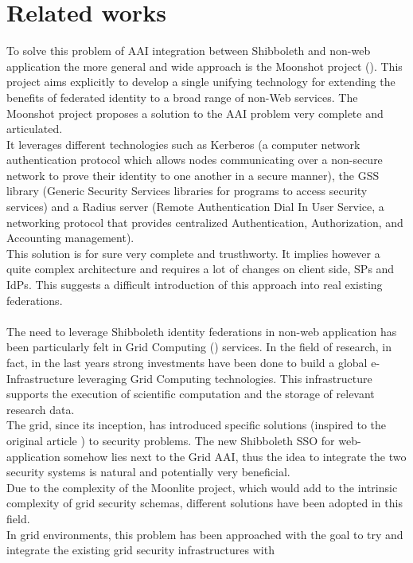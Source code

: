 \section{Related works}
To solve this problem of AAI integration between Shibboleth and non-web application the more general and wide approach is the Moonshot project (\cite{Howlett-2010}).
This project aims explicitly to develop a single unifying technology for extending the benefits of federated identity to a broad range of
non-Web services.
The Moonshot project proposes a solution to the AAI problem very complete and articulated.\\
It leverages different technologies such as Kerberos (a computer network authentication protocol which allows nodes communicating over a
non-secure network to prove their identity to one another in a secure manner), the GSS library (Generic Security Services libraries for
programs to access security services) and a Radius server (Remote Authentication Dial In User Service, a networking protocol that provides
centralized Authentication, Authorization, and Accounting management).\\
This solution is for sure very complete and trusthworty.
It implies however a quite complex architecture and requires a lot of changes on client side, SPs and IdPs.
This suggests a difficult introduction of this approach into real existing federations.\\
\\
The need to leverage Shibboleth identity federations in non-web application has been particularly felt in Grid Computing
(\cite{Kesselman-1998}) services.
In the field of research, in fact, in the last years strong investments have been done to build a global e-Infrastructure leveraging Grid
Computing technologies.
This infrastructure supports the execution of scientific computation and the storage of relevant research data.\\
The grid, since its inception, has introduced specific solutions (inspired to the original article \cite{Foster-1998}) to security problems.
The new Shibboleth SSO for web-application somehow lies next to the Grid AAI, thus the idea to integrate the two security systems is natural
and potentially very beneficial.\\
Due to the complexity of the Moonlite project, which would add to the intrinsic complexity of grid security schemas, different solutions have
been adopted in this field.
\\
In grid environments, this problem has been approached with the goal to try and integrate the existing grid security infrastructures with
